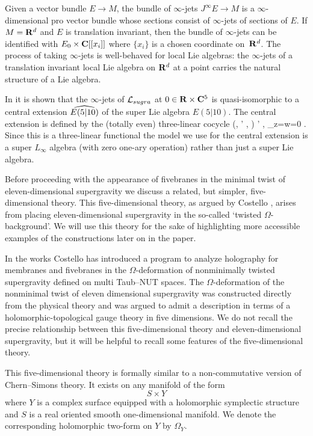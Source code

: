 Given a vector bundle $E \to M$, the bundle of $\infty$-jets $J^\infty E \to M$ is a $\infty$-dimensional pro vector bundle whose sections consist of $\infty$-jets of sections of $E$.
If $M = \R^d$ and $E$ is translation invariant, then the bundle of $\infty$-jets can be identified with $E_0 \times \C[[x_i]]$ where $\{x_i\}$ is a chosen coordinate on~$\R^d$. 
The process of taking $\infty$-jets is well-behaved for local Lie algebras:
the $\infty$-jets of a translation invariant local Lie algebra on $\R^d$ at a point carries the natural structure of a Lie algebra.

In \cite{RSW} it is shown that the $\infty$-jets of $\cL_{sugra}$ at $0 \in \R \times \C^5$ is quasi-isomorphic to a central extension $\Hat{E(5|10)}$ of the super Lie algebra $E(5|10)$.
The central extension is defined by the (totally even) three-linear cocycle
\beqn\label{eqn:e510central}
(\mu, \mu' , \alpha) \mapsto \<\mu \wedge \mu' , \alpha\>_{z=w=0} \in \C .
\eeqn
Since this is a three-linear functional the model we use for the central extension is a super $L_\infty$ algebra (with zero one-ary operation) rather than just a super Lie algebra.

\parsec[s:twistedsugra]

Before proceeding with the appearance of fivebranes in the minimal twist of eleven-dimensional supergravity we discuss a related, but simpler, five-dimensional theory.
This five-dimensional theory, as argued by Costello \cite{CostelloM5}, arises from placing eleven-dimensional supergravity in the so-called `twisted $\Omega$-background'.
We will use this theory for the sake of highlighting more accessible examples of the constructions later on in the paper. 

In the works \cite{CostelloM5,CostelloM2} Costello has introduced a program to analyze holography for membranes and fivebranes in the $\Omega$-deformation of nonminimally twisted supergravity defined on multi Taub--NUT spaces.
The $\Omega$-deformation of the nonminimal twist of eleven dimensional supergravity was constructed directly from the physical theory and was argued to admit a description in terms of a holomorphic-topological gauge theory in five dimensions.
We do not recall the precise relationship between this five-dimensional theory and eleven-dimensional supergravity, but it will be helpful to recall some features of the five-dimensional theory. 

This five-dimensional theory is formally similar to a non-commutative version of Chern--Simons theory.
It exists on any manifold of the form
\[
  S\times Y
\]
where $Y$ is a complex surface equipped with a holomorphic symplectic structure and $S$ is a real oriented smooth one-dimensional manifold.
We denote the corresponding holomorphic two-form on $Y$ by $\Omega_Y$.

